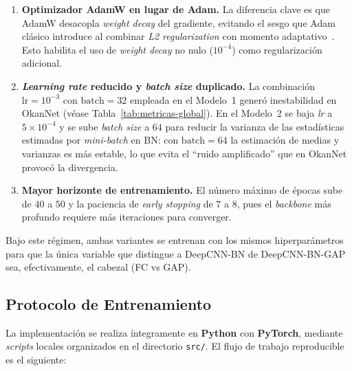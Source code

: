 \begin{enumerate}
  \item \textbf{Optimizador AdamW en lugar de Adam.} La
        diferencia clave es que AdamW desacopla
        \textit{weight decay} del gradiente, evitando el
        sesgo que Adam clásico introduce al combinar
        \textit{L2 regularization} con momento
        adaptativo~\cite{loshchilov2017decoupled}. Esto
        habilita el uso de \textit{weight decay} no nulo
        ($10^{-4}$) como regularización adicional.
  \item \textbf{\textit{Learning rate} reducido y
        \textit{batch size} duplicado.} La combinación
        $\text{lr}=10^{-3}$ con $\text{batch}=32$
        empleada en el Modelo~1 generó inestabilidad en
        OkanNet (véase Tabla~\ref{tab:metricas-global}). En el
        Modelo~2 se baja \textit{lr} a $5\times 10^{-4}$ y se
        sube \textit{batch size} a $64$ para reducir la
        varianza de las estadísticas estimadas por
        \textit{mini-batch} en BN: con $\text{batch}=64$ la
        estimación de medias y varianzas es más estable, lo
        que evita el ``ruido amplificado'' que en OkanNet
        provocó la divergencia.
  \item \textbf{Mayor horizonte de entrenamiento.} El número
        máximo de épocas sube de $40$ a $50$ y la paciencia
        de \textit{early stopping} de $7$ a $8$, pues el
        \textit{backbone} más profundo requiere más
        iteraciones para converger.
\end{enumerate}

Bajo este régimen, ambas variantes se entrenan con los mismos
hiperparámetros para que la única variable que distingue a
DeepCNN-BN de DeepCNN-BN-GAP sea, efectivamente, el cabezal
(FC vs GAP).

\subsection{Protocolo de Entrenamiento}
\label{sec:proto}
La implementación se realiza íntegramente en \textbf{Python} con
\textbf{PyTorch}, mediante \textit{scripts} locales organizados
en el directorio \texttt{src/}. El flujo de trabajo reproducible
es el siguiente:

